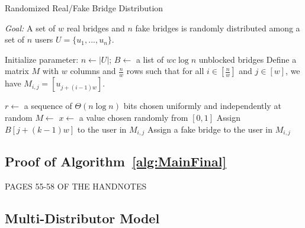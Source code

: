 \begin{algorithm}
	\caption{Randomized Real/Fake Bridge Distribution}
	\label{alg:DistributeFinal}
	
	\algFont \vspace{5pt}
	\textit{Goal:} A set of $w$ real bridges and $n$ fake bridges is randomly distributed among a set of $n$ users $U = \{u_1,...,u_n\}$.
	\begin{algorithmic}[1]
			\State Initialize parameter: $n \gets |U|$; $B \gets$ a list of $wc\log{n}$ unblocked bridges \label{ln:recruitBridgesFinal}
			\State Define a matrix $M$ with $w$ columns and $\frac{n}{w}$ rows such that for all $i \in [\frac{n}{w}]$ and $j \in [w]$, we
			\Statex \hspace{\algorithmicindent}have $M_{i,j} = [u_{j + (i-1)w}]$. \label{ln:defMatricesFinal}
			
			\State $r \gets$ a sequence of $\Theta(n\log{n})$ bits chosen uniformly and independently at random
			\State $M \gets$ 
					\State $x \gets$ a value chosen randomly from $[0,1]$
						\State Assign $B[j + (k-1)w]$ to the user in $M_{i,j}$ 	\label{ln:assignColumnsFinal}
					\Else
						\State Assign a fake bridge to the user in $M_{i,j}$
					\EndIf
				\EndFor
			\EndFor
		\EndFunction
	\end{algorithmic}
\end{algorithm}

\subsection{Proof of Algorithm~\ref{alg:MainFinal}} \label{sec:ProofFinal}
PAGES 55-58 OF THE HANDNOTES

\subsection{Multi-Distributor Model}

